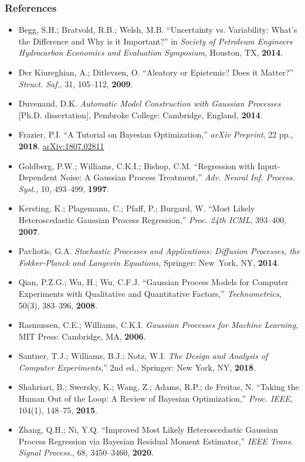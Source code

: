 \documentclass{beamer}
\begin{document}
	\begin{frame}[allowframebreaks]
		\frametitle{References}
	\begin{itemize}
			\item Begg, S.H.; Bratvold, R.B.; Welsh, M.B. ``Uncertainty vs. Variability: What’s the Difference and Why is it Important?'' in \emph{Society of Petroleum Engineers Hydrocarbon Economics and Evaluation Symposium}, Houston, TX, \textbf{2014}.
			\item Der Kiureghian, A.; Ditlevsen, O. ``Aleatory or Epistemic? Does it Matter?'' \emph{Struct. Saf.}, 31, 105--112, \textbf{2009}.
			\item Duvenaud, D.K. \emph{Automatic Model Construction with Gaussian Processes} [Ph.D. dissertation], Pembroke College: Cambridge, England, \textbf{2014}.
			\item Frazier, P.I. ``A Tutorial on Bayesian Optimization,'' \emph{arXiv Preprint}, 22 pp., \textbf{2018}. \href{https://arxiv.org/abs/1807.02811}{arXiv:1807.02811}
			\item Goldberg, P.W.; Williams, C.K.I.; Bishop, C.M. ``Regression with Input-Dependent Noise: A Gaussian Process Treatment,'' \emph{Adv. Neural Inf. Process. Syst.}, 10, 493--499, \textbf{1997}.
			\item Kersting, K.; Plagemann, C.; Pfaff, P.; Burgard, W. ``Most Likely Heteroscedastic Gaussian Process Regression,'' \emph{Proc. 24th ICML}, 393--400, \textbf{2007}.
			\item Pavliotis, G.A. \emph{Stochastic Processes and Applications: Diffusion Processes, the Fokker-Planck and Langevin Equations}, Springer: New~York, NY, \textbf{2014}.
			\item Qian, P.Z.G.; Wu, H.; Wu, C.F.J. ``Gaussian Process Models for Computer Experiments with Qualitative and Quantitative Factors,'' \emph{Technometrics}, 50(3), 383--396, \textbf{2008}.
			\item Rasmussen, C.E.; Williams, C.K.I. \emph{Gaussian Processes for Machine Learning}, MIT Press: Cambridge, MA, \textbf{2006}.
			\item Santner, T.J.; Williams, B.J.; Notz, W.I. \emph{The Design and Analysis of Computer Experiments},'' 2nd ed., Springer: New York, NY, \textbf{2018}.
			\item Shahriari, B.; Swersky, K.; Wang, Z.; Adams, R.P.; de Freitas, N. ``Taking the Human Out of the Loop: A Review of Bayesian Optimization,'' \emph{Proc. IEEE}, 104(1), 148--75, \textbf{2015}.
			\item Zhang, Q.H.; Ni, Y.Q. ``Improved Most Likely Heteroscedastic Gaussian Process Regression via Bayesian Residual Moment Estimator,'' \emph{IEEE Trans. Signal Process.}, 68, 3450--3460, \textbf{2020}.
		\end{itemize}
	\end{frame}
\end{document}
